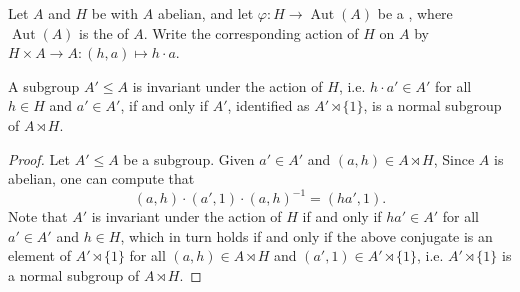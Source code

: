 \begin{lemma} \label{lemma:subgroup_of_the_normal_abelian_subgroup_of_a_semidirect_product_group_is_an_invariant_subgroup_iff_it_is_a_normal_subgroup_of_semidirect_product}
    Let $A$ and $H$ be  with $A$ abelian, and let $\varphi: H \to \operatorname{Aut}(A)$ be a , where $\operatorname{Aut}(A)$ is the  of $A$. Write the corresponding action of $H$ on $A$ by $H \times A \to A: (h,a) \mapsto h \cdot a$.

    A subgroup $A' \leq A$ is invariant under the action of $H$, i.e. $h \cdot a' \in A'$ for all $h \in H$ and $a' \in A'$, if and only if $A'$, identified as $A' \rtimes \{1\}$, is a normal subgroup of $A \rtimes H$. 
\end{lemma}
\begin{proof}
    Let $A' \leq A$ be a subgroup. Given $a' \in A'$ and $(a,h) \in A \rtimes H$, 
    Since $A$ is abelian, one can compute that 
    $$(a,h) \cdot (a',1) \cdot (a,h)^{-1} = (ha', 1).$$
    Note that $A'$ is invariant under the action of $H$ if and only if $ha' \in A'$ for all $a' \in A'$ and $h \in H$, which in turn holds if and only if the above conjugate is an element of $A' \rtimes \{1\}$ for all $(a,h) \in A \rtimes H$ and $(a',1) \in A' \rtimes \{1\}$, i.e.  $A' \rtimes \{1\}$ is a normal subgroup of $A \rtimes H$. 
\end{proof}